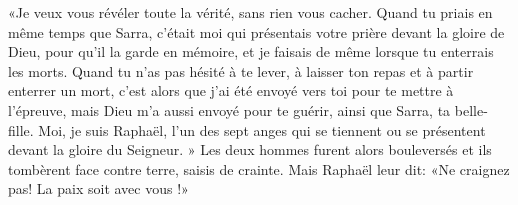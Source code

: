 «Je veux vous révéler toute la vérité, sans rien vous cacher. 
Quand tu priais en même temps que Sarra,
	c’était moi qui présentais votre prière devant la gloire de Dieu,
		pour qu’il la garde en mémoire,
	et je faisais de même lorsque tu enterrais les morts.
Quand tu n’as pas hésité à te lever,
		à laisser ton repas et à partir enterrer un mort,
	c’est alors que j’ai été envoyé vers toi pour te mettre à l’épreuve,
	mais Dieu m’a aussi envoyé pour te guérir, ainsi que Sarra, ta belle-fille.
Moi, je suis Raphaël,
	l’un des sept anges qui se tiennent ou se présentent
		devant la gloire du Seigneur. »
Les deux hommes furent alors bouleversés
	et ils tombèrent face contre terre, saisis de crainte.
Mais Raphaël leur dit: «Ne craignez pas!
	La paix soit avec vous !»
